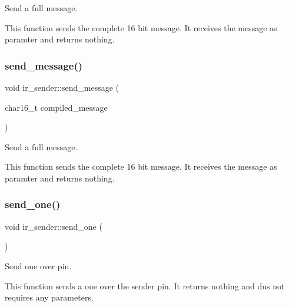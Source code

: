 Send a full message. 

This function sends the complete 16 bit message. It receives the message as paramter and returns nothing. \hypertarget{classir__sender_a6b23d2e93be4f000ca689395613ea487}{}\label{classir__sender_a6b23d2e93be4f000ca689395613ea487} 
\subsubsection{\texorpdfstring{send\+\_\+message()}{send\_message()}\hspace{0.1cm}{\footnotesize\ttfamily [2/2]}}
{\footnotesize\ttfamily void ir\+\_\+sender\+::send\+\_\+message (\begin{DoxyParamCaption}\item[{char16\+\_\+t}]{compiled\+\_\+message }\end{DoxyParamCaption})\hspace{0.3cm}{\ttfamily [inline]}}



Send a full message. 

This function sends the complete 16 bit message. It receives the message as paramter and returns nothing. \hypertarget{classir__sender_a53efa5b083ddbbc9f8de912a44135e08}{}\label{classir__sender_a53efa5b083ddbbc9f8de912a44135e08} 
\subsubsection{\texorpdfstring{send\+\_\+one()}{send\_one()}\hspace{0.1cm}{\footnotesize\ttfamily [1/2]}}
{\footnotesize\ttfamily void ir\+\_\+sender\+::send\+\_\+one (\begin{DoxyParamCaption}{ }\end{DoxyParamCaption})\hspace{0.3cm}{\ttfamily [inline]}}



Send one over pin. 

This function sends a one over the sender pin. It returns nothing and dus not requires any parameters. \hypertarget{classir__sender_a53efa5b083ddbbc9f8de912a44135e08}{}\label{classir__sender_a53efa5b083ddbbc9f8de912a44135e08} 
